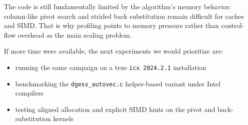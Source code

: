 \documentclass[11pt,a4paper]{article}
\begin{document}
The code is still fundamentally limited by the algorithm's memory behavior:
column-like pivot search and strided back substitution remain difficult for
caches and SIMD. That is why profiling points to memory pressure rather than
control-flow overhead as the main scaling problem.

If more time were available, the next experiments we would prioritize are:

\begin{itemize}
\item running the same campaign on a true \texttt{icx 2024.2.1} installation
\item benchmarking the \texttt{dgesv\_autovec.c} helper-based variant under Intel compilers
\item testing aligned allocation and explicit SIMD hints on the pivot and back-substitution kernels
\end{itemize}
\end{document}
